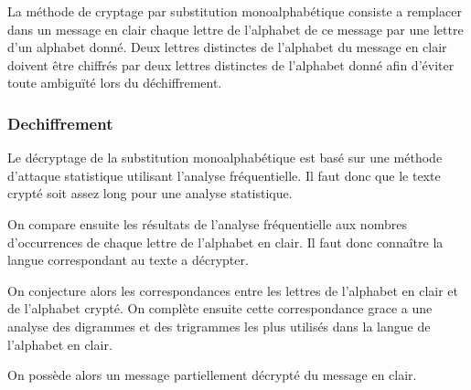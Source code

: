\documentclass[a4]{article}
\begin{document}
			La méthode de cryptage par substitution  monoalphabétique consiste a remplacer dans un message en clair chaque lettre 
			de l’alphabet de ce message par une lettre d’un alphabet donné. Deux lettres distinctes de l’alphabet du message en clair 
			doivent être chiffrés par deux lettres distinctes de l’alphabet donné afin d’éviter toute ambiguïté lors du déchiffrement.
			
			
					\subsubsection{Dechiffrement}
	
	Le  décryptage de la substitution monoalphabétique est basé sur une  méthode d’attaque statistique utilisant l’analyse fréquentielle.
	 Il faut donc que le texte crypté soit assez long pour une analyse statistique.

	On compare ensuite les résultats de l’analyse fréquentielle aux nombres d’occurrences
de chaque lettre de l’alphabet en clair. Il faut donc connaître la langue correspondant au texte a décrypter. 

	On conjecture alors les correspondances entre les lettres de l’alphabet en clair et de l’alphabet crypté.
	 On complète ensuite cette correspondance grace a une analyse des digrammes et des trigrammes les plus utilisés dans la langue de
	  l’alphabet en clair.

On possède alors un message partiellement décrypté du message en clair.
\end{document}

